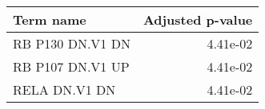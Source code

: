 \begin{tabular}{lr}
\toprule
       Term name &  Adjusted p-value \\
\midrule
RB P130 DN.V1 DN &          4.41e-02 \\
RB P107 DN.V1 UP &          4.41e-02 \\
   RELA DN.V1 DN &          4.41e-02 \\
\bottomrule
\end{tabular}
